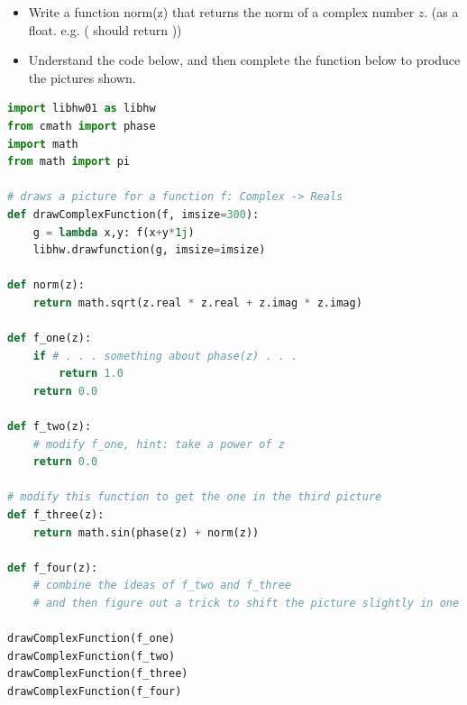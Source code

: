 \documentclass[letterpaper,11pt]{amsart}
\theoremstyle{plain}
\theoremstyle{definition}
\begin{document}
\begin{itemize}
  \item Write a function norm(z) that returns the norm of a complex number $z$. (as a float. e.g. ( should return )) 
  \item Understand the code below, and then complete the function below to produce the pictures shown.
    
\end{itemize}

\begin{lstlisting}[language=python]
import libhw01 as libhw
from cmath import phase
import math
from math import pi

# draws a picture for a function f: Complex -> Reals
def drawComplexFunction(f, imsize=300):
    g = lambda x,y: f(x+y*1j)
    libhw.drawfunction(g, imsize=imsize)

def norm(z):
    return math.sqrt(z.real * z.real + z.imag * z.imag)

def f_one(z):
    if # . . . something about phase(z) . . . 
        return 1.0
    return 0.0

def f_two(z):
    # modify f_one, hint: take a power of z
    return 0.0

# modify this function to get the one in the third picture 
def f_three(z):
    return math.sin(phase(z) + norm(z))

def f_four(z):
    # combine the ideas of f_two and f_three
    # and then figure out a trick to shift the picture slightly in one direction

drawComplexFunction(f_one)
drawComplexFunction(f_two)
drawComplexFunction(f_three)
drawComplexFunction(f_four)
\end{lstlisting}
\end{document}
